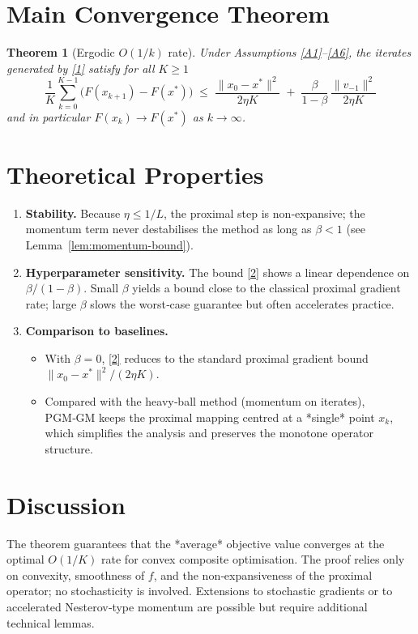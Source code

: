 \documentclass{article}
\newtheorem{theorem}{Theorem}
\begin{document}
\section*{Main Convergence Theorem}
\begin{theorem}[Ergodic $O(1/k)$ rate]\label{thm:rate}
Under Assumptions \ref{A1}–\ref{A6}, the iterates generated by \eqref{1} satisfy for all $K\ge 1$
\[
\boxed{
\frac{1}{K}\sum_{k=0}^{K-1}\bigl(F(x_{k+1})-F(x^{*})\bigr)
\;\le\;
\frac{\|x_{0}-x^{*}\|^{2}}{2\eta K}\;+\;
\frac{\beta}{1-\beta}\,\frac{\|v_{-1}\|^{2}}{2\eta K}
}
\tag{2}
\]
and in particular $F(x_{k})\to F(x^{*})$ as $k\to\infty$.
\end{theorem}

\section*{Theoretical Properties}
\begin{enumerate}[label=\textbf{P\arabic*:}, leftmargin=*]
\item \textbf{Stability.} Because $\eta\le 1/L$, the proximal step is non‑expansive; the momentum term never destabilises the method as long as $\beta<1$ (see Lemma~\ref{lem:momentum-bound}).
\item \textbf{Hyperparameter sensitivity.} The bound \eqref{2} shows a linear dependence on $\beta/(1-\beta)$. Small $\beta$ yields a bound close to the classical proximal gradient rate; large $\beta$ slows the worst‑case guarantee but often accelerates practice.
\item \textbf{Comparison to baselines.}
\begin{itemize}
\item With $\beta=0$, \eqref{2} reduces to the standard proximal gradient bound $ \|x_{0}-x^{*}\|^{2}/(2\eta K)$.
\item Compared with the heavy‑ball method (momentum on iterates), PGM‑GM keeps the proximal mapping centred at a *single* point $x_{k}$, which simplifies the analysis and preserves the monotone operator structure.
\end{itemize}
\end{enumerate}

\section*{Discussion}
The theorem guarantees that the *average* objective value converges at the optimal $O(1/K)$ rate for convex composite optimisation. The proof relies only on convexity, smoothness of $f$, and the non‑expansiveness of the proximal operator; no stochasticity is involved. Extensions to stochastic gradients or to accelerated Nesterov‑type momentum are possible but require additional technical lemmas.
\end{document}
